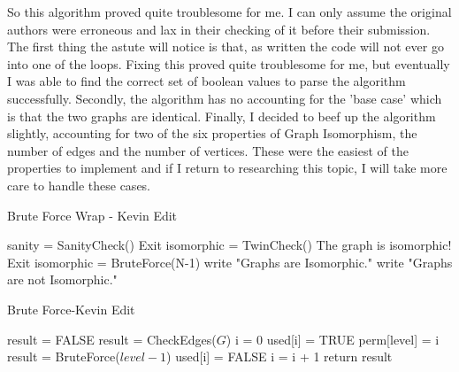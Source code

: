 \documentclass[notitlepage]{report}
\begin{document}
So this algorithm proved quite troublesome for me. I can only assume the original authors were erroneous and lax in their checking of it before their submission. The first thing the astute will notice is that, as written the code will not ever go into one of the loops. Fixing this proved quite troublesome for me, but eventually I was able to find the correct set of boolean values to parse the algorithm successfully. Secondly, the algorithm has no accounting for the 'base case' which is that the two graphs are identical. Finally, I decided to beef up the algorithm slightly, accounting for two of the six properties of Graph Isomorphism, the number of edges and the number of vertices. These were the easiest of the properties to implement and if I return to researching this topic, I will take more care to handle these cases.

\begin{algorithm}
\caption{Brute Force Wrap - Kevin Edit}
\begin{algorithmic}[1]

    \State sanity = SanityCheck()
    	\State Exit
    \EndIf
    \State isomorphic = TwinCheck()
    	\State The graph is isomorphic! Exit
   	\EndIf
   	\State isomorphic = BruteForce(N-1)
        \State write "Graphs are Isomorphic."
    \Else
    	\State write "Graphs are not Isomorphic."
    \EndIf
    \label{A2}
\EndProcedure
\end{algorithmic}
\end{algorithm}

\begin{algorithm}
\caption{Brute Force-Kevin Edit}
\begin{algorithmic}[1]

    \State result = FALSE 								
    	\State result = CheckEdges($G$)
    \Else
    	\State i = 0
	    				
	        	\State used[i] = TRUE 					
	        	\State perm[level] = i
	        	\State result = BruteForce($level - 1$)
	        	\State used[i] = FALSE					
	        \EndIf
	        \State i = i + 1	
	    \EndWhile
	\EndIf
	\State return result
\label{BruteForce2}
\EndProcedure

\end{algorithmic}
\end{algorithm}
\end{document}
